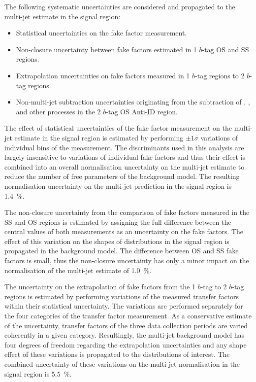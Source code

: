 The following systematic uncertainties are considered and propagated
to the multi-jet estimate in the \hadhad signal region:
\begin{itemize}

\item Statistical uncertainties on the fake factor measurement.

\item Non-closure uncertainty between fake factors estimated in 1
  $b$-tag OS and SS regions.

\item Extrapolation uncertainties on fake factors measured in 1
  $b$-tag regions to 2 $b$-tag regions.

\item Non-multi-jet subtraction uncertainties originating from the
  subtraction of \ttbar, \ttbarFakes, and other processes in the 2
  $b$-tag OS Anti-ID region.

\end{itemize}

The effect of statistical uncertainties of the fake factor measurement
on the multi-jet estimate in the signal region is estimated by
performing $\pm 1 \sigma$ variations of individual bins of the
measurement. The discriminants used in this analysis are largely
insensitive to variations of individual fake factors and thus their
effect is combined into an overall normalisation uncertainty on the
multi-jet estimate to reduce the number of free parameters of the
background model. The resulting normalisation uncertainty on the
multi-jet prediction in the signal region is \SI{1.4}{\percent}.

The non-closure uncertainty from the comparison of fake factors
measured in the SS and OS regions is estimated by assigning the full
difference between the central values of both measurements as an
uncertainty on the fake factors. The effect of this variation on the
shapes of distributions in the signal region is propagated in the
background model. The difference between OS and SS fake factors is
small, thus the non-closure uncertainty has only a minor impact on the
normalisation of the multi-jet estimate of \SI{1.0}{\percent}.

The uncertainty on the extrapolation of fake factors from the 1
$b$-tag to 2 $b$-tag regions is estimated by performing variations of
the measured transfer factors within their statistical
uncertainty. The variations are performed separately for the four
categories of the transfer factor measurement. As a conservative
estimate of the uncertainty, transfer factors of the three data
collection periods are varied coherently in a given
category. Resultingly, the multi-jet background model has four degrees
of freedom regarding the extrapolation uncertainties and any shape
effect of these variations is propagated to the distributions of
interest. The combined uncertainty of these variations on the
multi-jet normalisation in the signal region is \SI{5.5}{\percent}.

